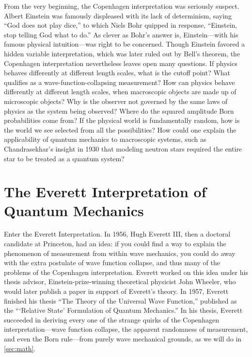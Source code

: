 \documentclass[
    12pt,
    letterpaper,
    aps,
    prd,
    longbibliography,
    twocolumn,
    nofootinbib,
    raggedbottom,
    amsmath,
    amssymb,
    amsfonts,
]{revtex4-1}
\begin{document}
From the very beginning, the Copenhagen interpretation was seriously suspect. Albert Einstein was famously displeased with its lack of determinism, saying ``God does not play dice,'' to which Niels Bohr quipped in response, ``Einstein, stop telling God what to do.''\cite{solvay} As clever as Bohr's answer is, Einstein---with his famous physical intuition---was right to be concerned. Though Einstein favored a hidden variable interpretation\cite{epr}, which was later ruled out by Bell's theorem\cite{bell}, the Copenhagen interpretation nevertheless leaves open many questions. If physics behaves differently at different length scales, what is the cutoff point? What qualifies as a wave-function-collapsing measurement? How can physics behave differently at different length scales, when macroscopic objects are made up of microscopic objects? Why is the observer not governed by the same laws of physics as the system being observed? Where do the squared amplitude Born probabilities come from? If the physical world is fundamentally random, how is the world we see selected from all the possibilities? How could one explain the applicability of quantum mechanics to macroscopic systems, such as Chandrasekhar's insight in 1930 that modeling neutron stars required the entire star to be treated as a quantum system?\cite{townsend}

\pagebreak

\section{The Everett Interpretation of Quantum Mechanics}
\label{sec:everett}

Enter the Everett Interpretation. In 1956, Hugh Everett III, then a doctoral candidate at Princeton, had an idea: if you could find a way to explain the phenomenon of measurement from within wave mechanics, you could do away with the extra postulate of wave function collapse, and thus many of the problems of the Copenhagen interpretation. Everett worked on this idea under his thesis advisor, Einstein-prize-winning theoretical physicist John Wheeler, who would later publish a paper in support of Everett's theory.\cite{wheeler} In 1957, Everett finished his thesis ``The Theory of the Universal Wave Function,''\cite{everett} published as the ```Relative State' Formulation of Quantum Mechanics.''\cite{relativestate} In his thesis, Everett succeeded in deriving every one of the strange quirks of the Copenhagen interpretation---wave function collapse, the apparent randomness of measurement, and even the Born rule---from purely wave mechanical grounds, as we will do in \autoref{sec:math}.
\end{document}
